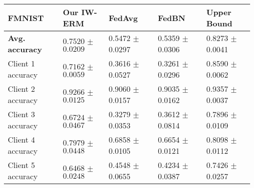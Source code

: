 

\begin{tabular}{lllll}
\toprule
{\bf FMNIST} &   {\bf Our IW-ERM} &   FedAvg &  FedBN &  Upper Bound\\
\midrule
\textbf{Avg. accuracy}  &  $\boldsymbol{0.7520}$ $\pm$ $\boldsymbol{0.0209}$ & 0.5472  $\pm$ 0.0297& 0.5359 $\pm$ 0.0306&0.8273 $\pm$ 0.0041\\
Client 1 accuracy & $\boldsymbol{0.7162}$ $\pm$ $\boldsymbol{0.0059}$ & 0.3616 $\pm$ 0.0527 & 0.3261 $\pm$ 0.0296&0.8590 $\pm$ 0.0062\\
Client 2 accuracy &  $\boldsymbol{0.9266}$ $\pm$ $\boldsymbol{0.0125}$   & 0.9060 $\pm$ 0.0157 & 0.9035 $\pm$ 0.0162& 0.9357 $\pm$ 0.0037\\
Client 3 accuracy &  $\boldsymbol{0.6724}$ $\pm$ $\boldsymbol{0.0467}$  & 0.3279 $\pm$ 0.0353 & 0.3612 $\pm$ 0.0814& 0.7896 $\pm$ 0.0109\\
Client 4 accuracy & $\boldsymbol{0.7979}$ $\pm$ $\boldsymbol{0.0448}$  & 0.6858 $\pm$ 0.0105 & 0.6654 $\pm$ 0.0121& 0.8098 $\pm$ 0.0112\\
Client 5 accuracy & $\boldsymbol{0.6468}$ $\pm$ $\boldsymbol{0.0248}$  & 0.4548 $\pm$ 0.0655& 0.4234 $\pm$ 0.0387& 0.7426 $\pm$ 0.0257\\
\bottomrule
\end{tabular}
